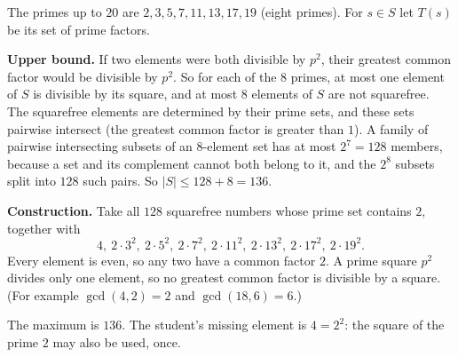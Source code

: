 The primes up to $20$ are $2,3,5,7,11,13,17,19$ (eight primes). For $s\in S$ let $T(s)$ be its set of prime factors.

\textbf{Upper bound.} If two elements were both divisible by $p^2$, their greatest common factor would be divisible by $p^2$. So for each of the $8$ primes, at most one element of $S$ is divisible by its square, and at most $8$ elements of $S$ are not squarefree. The squarefree elements are determined by their prime sets, and these sets pairwise intersect (the greatest common factor is greater than $1$). A family of pairwise intersecting subsets of an $8$-element set has at most $2^7=128$ members, because a set and its complement cannot both belong to it, and the $2^8$ subsets split into $128$ such pairs. So $|S|\le128+8=136$.

\textbf{Construction.} Take all $128$ squarefree numbers whose prime set contains $2$, together with
\[
4,\ 2\cdot3^2,\ 2\cdot5^2,\ 2\cdot7^2,\ 2\cdot11^2,\ 2\cdot13^2,\ 2\cdot17^2,\ 2\cdot19^2 .
\]
Every element is even, so any two have a common factor $2$. A prime square $p^2$ divides only one element, so no greatest common factor is divisible by a square. (For example $\gcd(4,2)=2$ and $\gcd(18,6)=6$.)

The maximum is $\boxed{136}$. The student's missing element is $4=2^2$: the square of the prime $2$ may also be used, once.
